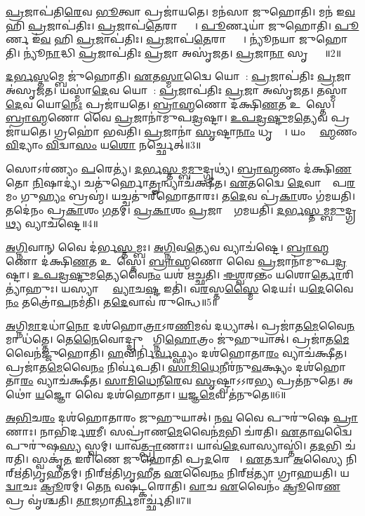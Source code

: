 \ul{𑌪𑍍𑌰}𑌜𑌾𑌪॑𑌤𑌿\ul{𑌰𑍇}𑌵 \ul{𑌭𑍂}𑌤𑍍𑌵𑌾 𑌪𑍍𑌰𑌜𑌾॑𑌯𑌤𑍇।
𑌮𑌨॑𑌸𑌾 𑌜𑍁𑌹𑍋𑌤𑌿।
𑌮𑌨॑ 𑌇\ul{𑌵} 𑌹𑌿 \ul{𑌪𑍍𑌰}𑌜𑌾𑌪॑𑌤𑌿𑌃।
\ul{𑌪𑍍𑌰}𑌜𑌾𑌪॑\ul{𑌤𑍇}𑌰𑌾𑌪𑍍𑌤𑍍𑌯𑍈᳚।
\ul{𑌪𑍂}𑌰𑍍𑌣𑌯𑌾॑ 𑌜𑍁𑌹𑍋𑌤𑌿।
\ul{𑌪𑍂}𑌰𑍍𑌣 𑌇॑\ul{𑌵} 𑌹𑌿 \ul{𑌪𑍍𑌰}𑌜𑌾𑌪॑𑌤𑌿𑌃।
\ul{𑌪𑍍𑌰}𑌜𑌾𑌪॑\ul{𑌤𑍇}𑌰𑌾𑌪𑍍𑌤𑍍𑌯𑍈᳚।
𑌨𑍍𑌯𑍂॑𑌨𑌯𑌾 𑌜𑍁𑌹𑍋𑌤𑌿।
𑌨𑍍𑌯𑍂॑\ul{𑌨𑌾}𑌦𑍍𑌧𑌿 \ul{𑌪𑍍𑌰}𑌜𑌾𑌪॑𑌤𑌿𑌃 \ul{𑌪𑍍𑌰}𑌜𑌾 𑌅𑌸𑍃॑𑌜𑌤।
\ul{𑌪𑍍𑌰}𑌜𑌾\ul{𑌨𑌾}\ul{} 𑌸𑍃𑌷𑍍𑌟𑍍𑌯𑍈᳚॥2॥

\ul{𑌦}\ul{𑌰𑍍𑌭}\ul{𑌸𑍍𑌤}𑌮𑍍𑌬𑍇 𑌜𑍁॑𑌹𑍋𑌤𑌿।
\ul{𑌏}𑌤\ul{𑌸𑍍𑌮𑌾}𑌦𑍍𑌵𑍈 𑌯𑍋𑌨𑍇᳚: \ul{𑌪𑍍𑌰}𑌜𑌾𑌪॑𑌤𑌿𑌃 \ul{𑌪𑍍𑌰}𑌜𑌾 𑌅॑𑌸𑍃𑌜𑌤।
𑌯𑌸𑍍𑌮𑌾॑\ul{𑌦𑍇}𑌵 𑌯𑍋𑌨𑍇᳚: \ul{𑌪𑍍𑌰}𑌜𑌾𑌪॑𑌤𑌿𑌃 \ul{𑌪𑍍𑌰}𑌜𑌾 𑌅𑌸𑍃॑𑌜𑌤।
𑌤𑌸𑍍𑌮𑌾॑\ul{𑌦𑍇}𑌵 𑌯𑍋\ul{𑌨𑍇𑌃} 𑌪𑍍𑌰𑌜𑌾॑𑌯𑌤𑍇।
\ul{𑌬𑍍𑌰𑌾}\ul{𑌹𑍍𑌮}𑌣𑍋 𑌦॑𑌕𑍍𑌷𑌿\ul{𑌣}𑌤 𑌉𑌪𑌾᳚𑌸𑍍𑌤𑍇।
\ul{𑌬𑍍𑌰𑌾}\ul{𑌹𑍍𑌮}𑌣𑍋 𑌵𑍈 \ul{𑌪𑍍𑌰}𑌜𑌾𑌨𑌾॑𑌮𑍁𑌪\ul{𑌦𑍍𑌰}𑌷𑍍𑌟𑌾।
\ul{𑌉}\ul{𑌪}\ul{𑌦𑍍𑌰}\ul{𑌷𑍍𑌟𑍁}𑌮\ul{𑌤𑍍𑌯𑍇}𑌵 𑌪𑍍𑌰𑌜𑌾॑𑌯𑌤𑍇।
𑌗𑍍𑌰𑌹𑍋॑ 𑌭𑌵𑌤𑌿।
\ul{𑌪𑍍𑌰}𑌜𑌾𑌨𑌾॑ \ul{𑌸𑍃}𑌷𑍍𑌟𑌾\ul{𑌨𑌾𑌂} 𑌧𑍃𑌤𑍍𑌯𑍈᳚।
𑌯𑌂 𑌬𑍍𑌰𑌾᳚\ul{𑌹𑍍𑌮}𑌣𑌂 \ul{𑌵𑌿}𑌦𑍍𑌯𑌾𑌂 \ul{𑌵𑌿}𑌦𑍍𑌵𑌾\ul{𑌸𑌂} 𑌯\ul{𑌶𑍋} 𑌨𑌰𑍍𑌚𑍍𑌛𑍇𑌤𑍍॥3॥

𑌸𑍋𑌽𑌰॑𑌣𑍍𑌯𑌂 \ul{𑌪}𑌰𑍇𑌤𑍍𑌯॑।
\ul{𑌦}\ul{𑌰𑍍𑌭}\ul{𑌸𑍍𑌤}𑌮𑍍𑌬\ul{𑌮𑍁}𑌦𑍍𑌗𑍍𑌰𑌥𑍍𑌯॑।
\ul{𑌬𑍍𑌰𑌾}\ul{𑌹𑍍𑌮}𑌣𑌂 𑌦॑𑌕𑍍𑌷𑌿\ul{𑌣}𑌤𑍋 \ul{𑌨𑌿}𑌷𑌾𑌦𑍍𑌯॑।
𑌚𑌤𑍁॑𑌰𑍍\mbox{}𑌹𑍋\ul{𑌤𑍄}𑌨𑍍𑌵𑍍𑌯𑌾𑌚॑𑌕𑍍𑌷𑍀𑌤।
\ul{𑌏}𑌤𑌦𑍍𑌵𑍈 \ul{𑌦𑍇}𑌵𑌾𑌨𑌾𑌂᳚ 𑌪\ul{𑌰}𑌮𑌂 𑌗𑍁\ul{𑌹𑍍𑌯𑌂} 𑌬𑍍𑌰𑌹𑍍𑌮॑।
𑌯𑌚𑍍𑌚𑌤𑍁॑𑌰𑍍‌\mbox{}𑌹𑍋𑌤𑌾𑌰𑌃।
𑌤\ul{𑌦𑍇}𑌵 𑌪𑍍𑌰॑\ul{𑌕𑌾}𑌶𑌂 𑌗॑𑌮𑌯𑌤𑌿।
𑌤𑌦𑍇॑𑌨𑌂 𑌪𑍍𑌰\ul{𑌕𑌾}𑌶𑌂 \ul{𑌗}𑌤𑌮𑍍।
\ul{𑌪𑍍𑌰}\ul{𑌕𑌾}𑌶𑌂 \ul{𑌪𑍍𑌰}𑌜𑌾𑌨𑌾𑌂᳚ 𑌗𑌮𑌯𑌤𑌿।
\ul{𑌦}\ul{𑌰𑍍𑌭}\ul{𑌸𑍍𑌤}𑌮𑍍𑌬\ul{𑌮𑍁}𑌦𑍍𑌗𑍍𑌰\ul{𑌥𑍍𑌯} 𑌵𑍍𑌯𑌾𑌚॑𑌷𑍍𑌟𑍇॥4॥

\ul{𑌅}\ul{𑌗𑍍𑌨𑌿}𑌵𑌾𑌨𑍍 𑌵𑍈 𑌦॑𑌰𑍍𑌭\ul{𑌸𑍍𑌤}𑌮𑍍𑌬𑌃।
\ul{𑌅}\ul{𑌗𑍍𑌨𑌿}𑌵\ul{𑌤𑍍𑌯𑍇}𑌵 𑌵𑍍𑌯𑌾𑌚॑𑌷𑍍𑌟𑍇।
\ul{𑌬𑍍𑌰𑌾}\ul{𑌹𑍍𑌮}𑌣𑍋 𑌦॑𑌕𑍍𑌷𑌿\ul{𑌣}𑌤 𑌉𑌪𑌾᳚𑌸𑍍𑌤𑍇।
\ul{𑌬𑍍𑌰𑌾}\ul{𑌹𑍍𑌮}𑌣𑍋 𑌵𑍈 \ul{𑌪𑍍𑌰}𑌜𑌾𑌨𑌾॑𑌮𑍁𑌪\ul{𑌦𑍍𑌰}𑌷𑍍𑌟𑌾।
\ul{𑌉}\ul{𑌪}\ul{𑌦𑍍𑌰}\ul{𑌷𑍍𑌟𑍁}𑌮\ul{𑌤𑍍𑌯𑍇}𑌵𑍈\ul{𑌨𑌂} 𑌯𑌶॑ 𑌋𑌚𑍍𑌛𑌤𑌿।
\ul{𑌈}\ul{𑌶𑍍𑌵}𑌰𑌨𑍍𑌤𑌂 𑌯𑌶𑍋\ul{𑌰𑍍𑌤𑍋}𑌰𑌿𑌤𑍍𑌯𑌾॑𑌹𑍁𑌃।
𑌯𑌸𑍍𑌯𑌾𑌨𑍍𑌤𑍇᳚ \ul{𑌵𑍍𑌯𑌾}𑌚\ul{𑌷𑍍𑌟} 𑌇𑌤𑌿॑।
𑌵\ul{𑌰}𑌸𑍍𑌤\ul{𑌸𑍍𑌮𑍈} 𑌦𑍇𑌯𑌃॑।
𑌯\ul{𑌦𑍇}𑌵𑍈\ul{𑌨𑌂} 𑌤𑌤𑍍𑌰𑍋॑\ul{𑌪}𑌨𑌮॑𑌤𑌿।
𑌤\ul{𑌦𑍇}𑌵𑌾𑌵॑ 𑌰𑍁𑌨𑍍𑌧𑍇॥5॥

\ul{𑌅}𑌗𑍍𑌨𑌿\ul{𑌮𑌾}𑌦𑌧𑌾॑\ul{𑌨𑍋} 𑌦𑌶॑𑌹𑍋\ul{𑌤𑍍𑌰𑌾}\-𑌽𑌰\ul{𑌣𑌿}𑌮𑌵॑ 𑌦𑌧𑍍𑌯𑌾𑌤𑍍।
𑌪𑍍𑌰𑌜𑌾॑𑌤\ul{𑌮𑍇}𑌵𑍈\ul{𑌨}𑌮𑌾 𑌧॑𑌤𑍍𑌤𑍇।
𑌤𑍇\ul{𑌨𑍈}𑌵𑍋𑌦𑍍𑌦𑍍𑌰𑍁𑌤𑍍𑌯𑌾᳚𑌗𑍍𑌨𑌿\ul{𑌹𑍋}𑌤𑍍𑌰𑌂 𑌜𑍁॑𑌹𑍁𑌯𑌾𑌤𑍍।
𑌪𑍍𑌰𑌜𑌾॑𑌤\ul{𑌮𑍇}𑌵𑍈𑌨॑𑌜𑍍𑌜𑍁𑌹𑍋𑌤𑌿।
\ul{𑌹}𑌵𑌿𑌰𑍍𑌨𑌿॑\ul{𑌰𑍍𑌵}𑌫𑍍𑌸𑍍𑌯𑌂 𑌦𑌶॑𑌹𑍋𑌤𑌾\ul{𑌰𑌂} 𑌵𑍍𑌯𑌾𑌚॑𑌕𑍍𑌷𑍀𑌤।
𑌪𑍍𑌰𑌜𑌾॑𑌤\ul{𑌮𑍇}𑌵𑍈\ul{𑌨𑌂} 𑌨𑌿𑌰𑍍𑌵॑𑌪𑌤𑌿।
\ul{𑌸𑌾}\ul{𑌮𑌿}\ul{𑌧𑍇}𑌨𑍀𑌰॑𑌨𑍁\ul{𑌵}𑌕𑍍𑌷𑍍𑌯𑌂 𑌦𑌶॑𑌹𑍋𑌤𑌾\ul{𑌰𑌂} 𑌵𑍍𑌯𑌾𑌚॑𑌕𑍍𑌷𑍀𑌤।
\ul{𑌸𑌾}\ul{𑌮𑌿}\ul{𑌧𑍇}𑌨𑍀\ul{𑌰𑍇}𑌵 \ul{𑌸𑍃}𑌷𑍍𑌟𑍍𑌵𑌾\-𑌽𑌽𑌰\ul{𑌭𑍍𑌯} 𑌪𑍍𑌰𑌤॑𑌨𑍁𑌤𑍇।
𑌅𑌥𑍋॑ \ul{𑌯}𑌜𑍍𑌞𑍋 𑌵𑍈 𑌦𑌶॑𑌹𑍋𑌤𑌾।
\ul{𑌯}𑌜𑍍𑌞\ul{𑌮𑍇}𑌵 𑌤॑𑌨𑍁𑌤𑍇॥6॥

\ul{𑌅}\ul{𑌭𑌿}𑌚\ul{𑌰𑌂} 𑌦𑌶॑𑌹𑍋𑌤𑌾𑌰𑌂 𑌜𑍁𑌹𑍁𑌯𑌾𑌤𑍍।
𑌨\ul{𑌵} 𑌵𑍈 𑌪𑍁𑌰𑍁॑𑌷𑍇 \ul{𑌪𑍍𑌰𑌾}𑌣𑌾𑌃।
𑌨𑌾𑌭𑌿॑𑌰𑍍𑌦\ul{𑌶}𑌮𑍀।
𑌸𑌪𑍍𑌰𑌾॑𑌣\ul{𑌮𑍇}𑌵𑍈𑌨॑\ul{𑌮}𑌭𑌿 𑌚॑𑌰𑌤𑌿।
\ul{𑌏}𑌤𑌾\ul{𑌵}𑌦𑍍𑌵𑍈 𑌪𑍁𑌰𑍁॑𑌷\ul{𑌸𑍍𑌯} 𑌸𑍍𑌵𑌮𑍍।
𑌯𑌾𑌵॑\ul{𑌤𑍍𑌪𑍍𑌰𑌾}𑌣𑌾𑌃।
𑌯𑌾𑌵॑\ul{𑌦𑍇}𑌵𑌾𑌸𑍍𑌯𑌾𑌸𑍍𑌤𑌿॑।
𑌤\ul{𑌦}𑌭𑌿 𑌚॑𑌰𑌤𑌿।
𑌸𑍍𑌵𑌕𑍃॑\ul{𑌤} 𑌇𑌰𑌿॑𑌣𑍇 𑌜𑍁𑌹𑍋𑌤𑌿 𑌪𑍍𑌰\ul{𑌦}𑌰𑍇 𑌵𑌾᳚।
\ul{𑌏}𑌤𑌦𑍍𑌵𑌾 \ul{𑌅}𑌸𑍍𑌯𑍈 𑌨𑌿𑌰𑍍‌\mbox{}𑌋॑𑌤𑌿𑌗𑍃𑌹𑍀𑌤𑌮𑍍।
𑌨𑌿𑌰𑍍‌\mbox{}𑌋॑𑌤𑌿𑌗𑍃𑌹𑍀𑌤 \ul{𑌏}𑌵𑍈\ul{𑌨𑌂} 𑌨𑌿𑌰𑍍‌\mbox{}𑌋॑𑌤𑍍𑌯𑌾 𑌗𑍍𑌰𑌾𑌹𑌯𑌤𑌿।
𑌯\ul{𑌦𑍍𑌵𑌾}𑌚𑌃 \ul{𑌕𑍍𑌰𑍂}𑌰𑌮𑍍।
𑌤𑍇\ul{𑌨} 𑌵𑌷॑𑌟𑍍𑌕𑌰𑍋𑌤𑌿।
\ul{𑌵𑌾}𑌚 \ul{𑌏}𑌵𑍈𑌨𑌂॑ \ul{𑌕𑍍𑌰𑍂}𑌰𑍇\ul{𑌣} 𑌪𑍍𑌰 𑌵𑍃॑𑌶𑍍𑌚𑌤𑌿।
\ul{𑌤𑌾}𑌜𑌗𑌾\ul{𑌰𑍍𑌤𑌿}𑌮𑌾𑌰𑍍𑌚𑍍𑌛॑𑌤𑌿॥7॥\anuvakamend[𑌦𑌶॑𑌹𑍋\ul{𑌤𑌾} 𑌸𑍃𑌷𑍍𑌟𑍍𑌯𑌾॑ \ul{𑌋}𑌚𑍍𑌛𑍇𑌦𑍍𑌵𑍍𑌯𑌾𑌚॑𑌪𑍍𑌟𑍇 𑌰𑍁𑌨𑍍𑌧 \ul{𑌏}𑌵 𑌤॑𑌨𑍁\ul{𑌤𑍇} 𑌨𑌿𑌰𑍍‌\mbox{}𑌋॑𑌤𑌿𑌗𑍃𑌹𑍀\ul{𑌤𑌂} 𑌪𑌞𑍍𑌚॑ 𑌚]

